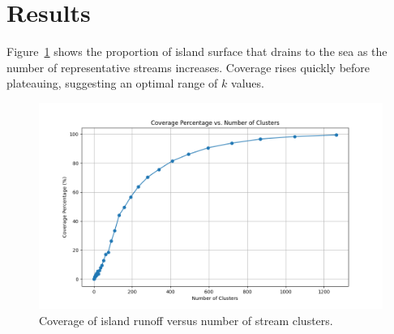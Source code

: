\section{Results}
Figure~\ref{fig:coverage} shows the proportion of island surface that drains to the sea as the number of representative streams increases. Coverage rises quickly before plateauing, suggesting an optimal range of $k$ values.

\begin{figure}[!t]
\centering
\includegraphics[width=0.8\linewidth]{../figures/coverage_clusters_final.png}
\caption{Coverage of island runoff versus number of stream clusters.}
\label{fig:coverage}
\end{figure}
